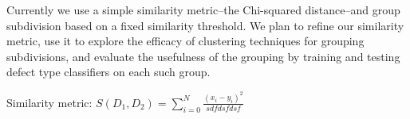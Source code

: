 \documentclass{sig-alternate-05-2015}
\begin{document}
Currently we use a simple similarity metric--the Chi-squared distance--and group subdivision
based on a fixed similarity threshold. We plan to refine our similarity metric, use it
to explore the efficacy of clustering techniques for grouping subdivisions, and evaluate the
usefulness of the grouping by training and testing defect type classifiers on each such group. 

Similarity metric:
$S(D_1,D_2) = \sum\limits_{i=0}^{N}\frac{(x_i - y_i)^2}{sdfdsfdsf}$



  
\end{document}
